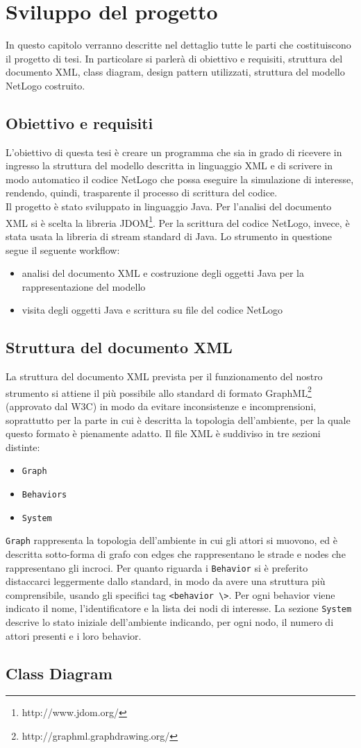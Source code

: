 \chapter{Sviluppo del progetto}
In questo capitolo verranno descritte nel dettaglio tutte le parti che costituiscono il progetto di tesi. In particolare si parlerà di obiettivo e requisiti, struttura del documento XML, class diagram, design pattern utilizzati, struttura del modello NetLogo costruito.\\ 

\section{Obiettivo e requisiti}
L'obiettivo di questa tesi è creare un programma che sia in grado di ricevere in ingresso la struttura del modello descritta in linguaggio XML e di scrivere in modo automatico il codice NetLogo che possa eseguire la simulazione di interesse, rendendo, quindi, trasparente il processo di scrittura del codice.\\
Il progetto è stato sviluppato in linguaggio Java. Per l'analisi del documento XML si è scelta la libreria JDOM\footnote{http://www.jdom.org/}. Per la scrittura del codice NetLogo, invece, è stata usata la libreria di stream standard di Java.
Lo strumento in questione segue il seguente workflow:
\begin{itemize}
\item analisi del documento XML e costruzione degli oggetti Java per la rappresentazione del modello
\item visita degli oggetti Java e scrittura su file del codice NetLogo
\end{itemize}

\section{Struttura del documento XML}
La struttura del documento XML prevista per il funzionamento del nostro strumento si attiene il più possibile allo standard di formato GraphML\footnote{http://graphml.graphdrawing.org/} (approvato dal W3C) in modo da evitare inconsistenze e incomprensioni, soprattutto per la parte in cui è descritta la topologia dell'ambiente, per la quale questo formato è pienamente adatto.
Il file XML è suddiviso in tre sezioni distinte:
\begin{itemize}
\item \texttt{Graph}
\item \texttt{Behaviors}
\item \texttt{System}
\end{itemize} 
\texttt{Graph} rappresenta la topologia dell'ambiente in cui gli attori si muovono, ed è descritta sotto-forma di grafo con edges che rappresentano le strade e nodes che rappresentano gli incroci. Per quanto riguarda i \texttt{Behavior} si è preferito distaccarci leggermente dallo standard, in modo da avere una struttura più comprensibile, usando gli specifici tag \texttt{<behavior \textbackslash>}. Per ogni behavior viene indicato il nome, l'identificatore e la lista dei nodi di interesse. La sezione \texttt{System} descrive lo stato iniziale dell'ambiente indicando, per ogni nodo, il numero di attori presenti e i loro behavior.

\section{Class Diagram}